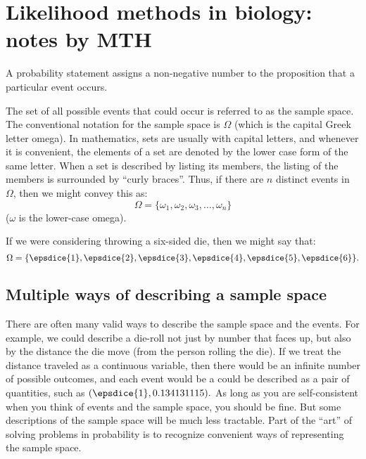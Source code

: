 \documentclass[11pt]{article}
\begin{document}
\section*{Likelihood methods in biology: notes by MTH}

%
%


A probability statement assigns a non-negative number to the proposition that a particular event occurs.

The set of all possible events that could occur is referred to as the sample space.
The conventional notation for the sample space is $\Omega$ (which is the capital Greek letter omega).
In mathematics, sets are usually with capital letters, and whenever it is convenient, the elements of a set are denoted by the lower case form of the same letter.
When a set is described by listing its members, the listing of the members is surrounded by ``curly braces''.
Thus, if there are $n$ distinct events in $\Omega$, then we might convey this as:
$$ \Omega = \{\omega_1, \omega_2, \omega_3, \ldots, \omega_n\}$$
($\omega$ is the lower-case omega).

If we were considering throwing a six-sided die, then we might say that:
 $$ \Omega = \{\epsdice{1},\epsdice{2}, \epsdice{3}, \epsdice{4}, \epsdice{5}, \epsdice{6}\}.$$

\subsection*{Multiple ways of describing a sample space}
There are often many valid ways to describe the sample space and the events.  For example, we could describe a die-roll not just by number that faces up, but also by the distance the die move (from the person rolling the die).
If we treat the distance traveled as a continuous variable, then there would be an infinite number of possible outcomes, and each event would be a could be described as a pair of quantities, such as $(\epsdice{1}, 0.134131115).$
As long as you are self-consistent when you think of events and the sample space, you should be fine. But some descriptions of the sample space will be much less tractable. Part of the ``art'' of solving problems in probability is to recognize convenient ways of representing the sample space.
\end{document}

